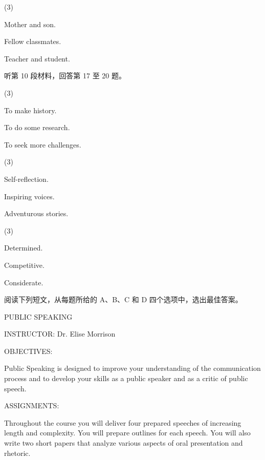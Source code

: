\documentclass{英语试卷}
\begin{document}
\begin{choices}(3)
  \item Mother and son.
  \item Fellow classmates.
  \item Teacher and student.
\end{choices}
\par 听第 10 段材料，回答第 17 至 20 题。\par
{}
\begin{choices}(3)
  \item To make history.
  \item To do some research.
  \item To seek more challenges.
\end{choices}
\begin{choices}(3)
  \item Self-reflection.
  \item Inspiring voices.
  \item Adventurous stories.
\end{choices}
\begin{choices}(3)
  \item Determined.
  \item Competitive.
  \item Considerate.
\end{choices}
\par 阅读下列短文，从每题所给的 A、B、C 和 D 四个选项中，选出最佳答案。\par
{}
\par PUBLIC SPEAKING\par
\par INSTRUCTOR: Dr. Elise Morrison\par
\par OBJECTIVES:\par
\par Public Speaking is designed to improve your understanding of the communication process and to develop your skills as a public speaker and as a critic of public speech.\par
\par ASSIGNMENTS:\par
\par Throughout the course you will deliver four prepared speeches of increasing length and complexity. You will prepare outlines for each speech. You will also write two short papers that analyze various aspects of oral presentation and rhetoric.\par
\end{document}
